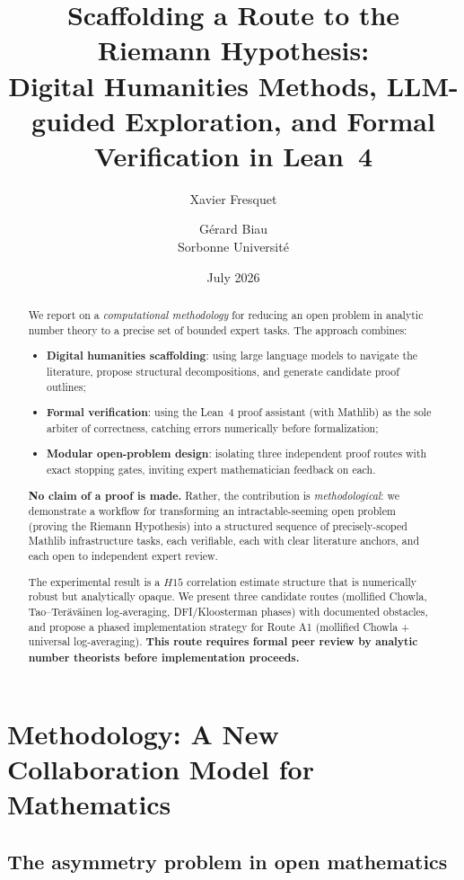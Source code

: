 \documentclass[11pt,a4paper]{article}
\title{Scaffolding a Route to the Riemann Hypothesis:\\
\large Digital Humanities Methods, LLM-guided Exploration, and Formal Verification in Lean~4}
\author{Xavier Fresquet \and Gérard Biau\\[0.5ex]
\small Sorbonne Université}
\date{July 2026}
\begin{document}
\maketitle

\begin{abstract}
We report on a \emph{computational methodology} for reducing an open problem in analytic number theory to a precise set of bounded expert tasks. The approach combines:
\begin{itemize}
\item \textbf{Digital humanities scaffolding}: using large language models to navigate the literature, propose structural decompositions, and generate candidate proof outlines;
\item \textbf{Formal verification}: using the Lean~4 proof assistant (with Mathlib) as the sole arbiter of correctness, catching errors numerically before formalization;
\item \textbf{Modular open-problem design}: isolating three independent proof routes with exact stopping gates, inviting expert mathematician feedback on each.
\end{itemize}

\textbf{No claim of a proof is made.} Rather, the contribution is \emph{methodological}: we demonstrate a workflow for transforming an intractable-seeming open problem (proving the Riemann Hypothesis) into a structured sequence of precisely-scoped Mathlib infrastructure tasks, each verifiable, each with clear literature anchors, and each open to independent expert review.

The experimental result is a $H15$ correlation estimate structure that is numerically robust but analytically opaque. We present three candidate routes (mollified Chowla, Tao–Teräväinen log-averaging, DFI/Kloosterman phases) with documented obstacles, and propose a phased implementation strategy for Route A1 (mollified Chowla + universal log-averaging). \textbf{This route requires formal peer review by analytic number theorists before implementation proceeds.}
\end{abstract}

\section{Methodology: A New Collaboration Model for Mathematics}

\subsection{The asymmetry problem in open mathematics}
\end{document}
